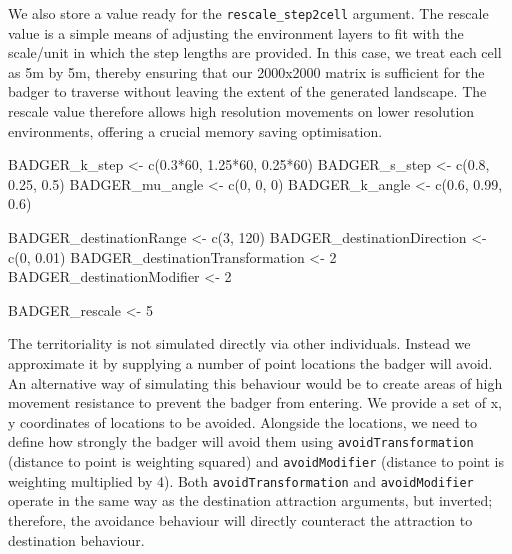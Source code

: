 \documentclass[10pt,a4paper]{article}
\newenvironment{Shaded}{}{}
\newcommand{\DecValTok}[1]{#1}
\newcommand{\FloatTok}[1]{#1}
\newcommand{\FunctionTok}[1]{#1}
\newcommand{\NormalTok}[1]{#1}
\newcommand{\OtherTok}[1]{#1}
\newcommand{\SpecialCharTok}[1]{#1}
\begin{document}
We also store a value ready for the \texttt{rescale\_step2cell} argument.
The rescale value is a simple means of adjusting the environment layers to fit with the scale/unit in which the step lengths are provided.
In this case, we treat each cell as 5m by 5m, thereby ensuring that our 2000x2000 matrix is sufficient for the badger to traverse without leaving the extent of the generated landscape.
The rescale value therefore allows high resolution movements on lower resolution environments, offering a crucial memory saving optimisation.

\begin{Shaded}
\begin{Highlighting}[]
\NormalTok{BADGER\_k\_step }\OtherTok{\textless{}{-}} \FunctionTok{c}\NormalTok{(}\FloatTok{0.3}\SpecialCharTok{*}\DecValTok{60}\NormalTok{, }\FloatTok{1.25}\SpecialCharTok{*}\DecValTok{60}\NormalTok{, }\FloatTok{0.25}\SpecialCharTok{*}\DecValTok{60}\NormalTok{)}
\NormalTok{BADGER\_s\_step }\OtherTok{\textless{}{-}} \FunctionTok{c}\NormalTok{(}\FloatTok{0.8}\NormalTok{, }\FloatTok{0.25}\NormalTok{, }\FloatTok{0.5}\NormalTok{)}
\NormalTok{BADGER\_mu\_angle }\OtherTok{\textless{}{-}} \FunctionTok{c}\NormalTok{(}\DecValTok{0}\NormalTok{, }\DecValTok{0}\NormalTok{, }\DecValTok{0}\NormalTok{)}
\NormalTok{BADGER\_k\_angle }\OtherTok{\textless{}{-}} \FunctionTok{c}\NormalTok{(}\FloatTok{0.6}\NormalTok{, }\FloatTok{0.99}\NormalTok{, }\FloatTok{0.6}\NormalTok{)}

\NormalTok{BADGER\_destinationRange }\OtherTok{\textless{}{-}} \FunctionTok{c}\NormalTok{(}\DecValTok{3}\NormalTok{, }\DecValTok{120}\NormalTok{)}
\NormalTok{BADGER\_destinationDirection }\OtherTok{\textless{}{-}} \FunctionTok{c}\NormalTok{(}\DecValTok{0}\NormalTok{, }\FloatTok{0.01}\NormalTok{)}
\NormalTok{BADGER\_destinationTransformation }\OtherTok{\textless{}{-}} \DecValTok{2}
\NormalTok{BADGER\_destinationModifier }\OtherTok{\textless{}{-}} \DecValTok{2}

\NormalTok{BADGER\_rescale }\OtherTok{\textless{}{-}} \DecValTok{5}
\end{Highlighting}
\end{Shaded}

The territoriality is not simulated directly via other individuals.
Instead we approximate it by supplying a number of point locations the badger will avoid.
An alternative way of simulating this behaviour would be to create areas of high movement resistance to prevent the badger from entering.
We provide a set of x, y coordinates of locations to be avoided.
Alongside the locations, we need to define how strongly the badger will avoid them using \texttt{avoidTransformation} (distance to point is weighting squared) and \texttt{avoidModifier} (distance to point is weighting multiplied by 4).
Both \texttt{avoidTransformation} and \texttt{avoidModifier} operate in the same way as the destination attraction arguments, but inverted; therefore, the avoidance behaviour will directly counteract the attraction to destination behaviour.
\end{document}
